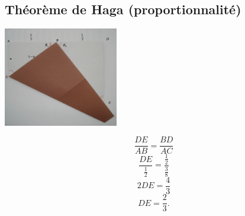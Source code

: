 \subsection{Théorème de Haga (proportionnalité)}
    \begin{multicols}{2}

    \begin{center}        
        \includegraphics[width=5cm]{haga_coupe_anote}
    \end{center}

    \begin{equation}
        \frac{ DE }{ AB }=\frac{ BD }{ AC }
    \end{equation}
    \begin{equation}
        \frac{ DE }{ \frac{ 1 }{2} }=\frac{ \frac{ 1 }{2} }{ \frac{ 3 }{ 8 } }
    \end{equation}
    \begin{equation}
        2DE=\frac{ 4 }{ 3 }
    \end{equation}
    \begin{equation}
        DE=\frac{2}{ 3 }.
    \end{equation}
    \end{multicols}
